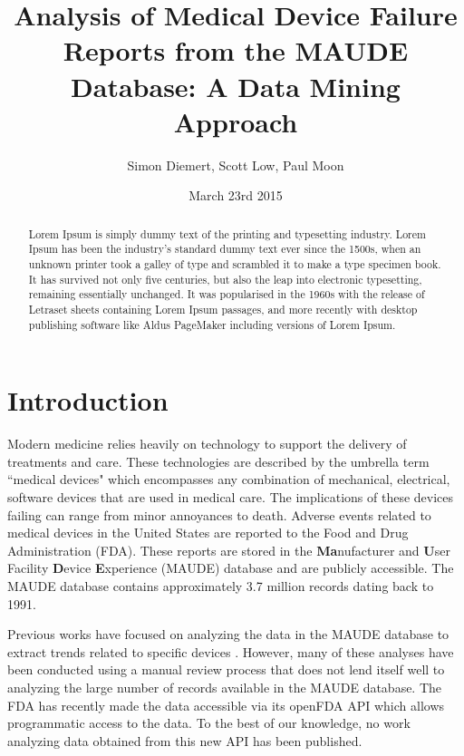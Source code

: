\documentclass[11pt, notitlepage,abstracton,oneside]{article}   	%
\title{Analysis of Medical Device Failure Reports from the MAUDE Database: A Data Mining Approach}
\author{Simon Diemert, Scott Low, Paul Moon}
\date{March 23rd 2015}							%
\begin{document}
\maketitle

\begin{abstract}


\thispagestyle{empty}
Lorem Ipsum is simply dummy text of the printing and typesetting industry. Lorem Ipsum has been the industry's standard dummy text ever since the 1500s, when an unknown printer took a galley of type and scrambled it to make a type specimen book. It has survived not only five centuries, but also the leap into electronic typesetting, remaining essentially unchanged. It was popularised in the 1960s with the release of Letraset sheets containing Lorem Ipsum passages, and more recently with desktop publishing software like Aldus PageMaker including versions of Lorem Ipsum.
\end{abstract}

\tableofcontents

\clearpage
\newpage
\setcounter{page}{1}
\section{Introduction}
Modern medicine relies heavily on technology to support the delivery of treatments and care. These technologies are described by the umbrella term ``medical devices" which encompasses any combination of mechanical, electrical, software devices that are used in medical care. The implications of these devices failing can range from minor annoyances to death. Adverse events related to medical devices in the United States are reported to the Food and Drug Administration (FDA). These reports are stored in the \textbf{Ma}nufacturer and \textbf{U}ser Facility \textbf{D}evice \textbf{E}xperience (MAUDE) database and are publicly accessible. The MAUDE database contains approximately 3.7 million records dating back to 1991. 

Previous works have focused on analyzing the data in the MAUDE database to extract trends related to specific devices \cite{weber_preliminary_2011}. However, many of these analyses have been conducted using a manual review process that does not lend itself well to analyzing the large number of records available in the MAUDE database. The FDA has recently made the data accessible via its openFDA API which allows programmatic access to the data. To the best of our knowledge, no work analyzing data obtained from this new API has been published.
\end{document}
